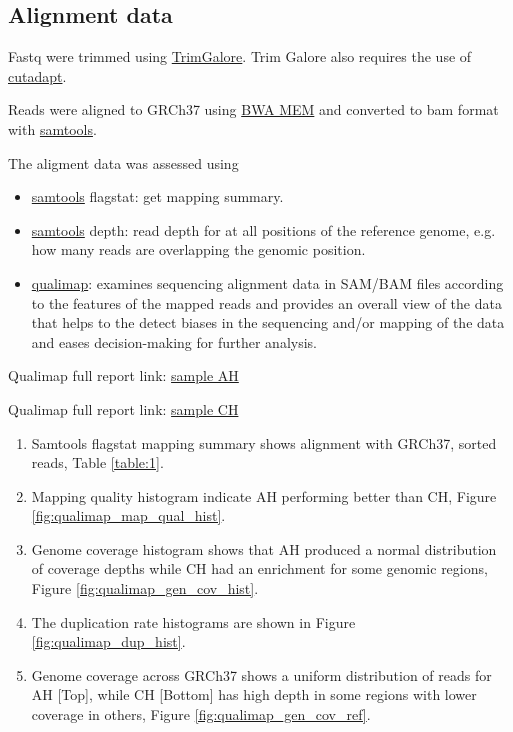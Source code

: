 \documentclass{article}
\begin{document}
\clearpage
\subsection{Alignment data}
\label{align_data}
Fastq were trimmed using
\href{https://www.bioinformatics.babraham.ac.uk/projects/trim_galore/}{TrimGalore}.  
Trim Galore also requires the use of 
\href{ https://github.com/marcelm/cutadapt/}{cutadapt}.

Reads were aligned to GRCh37 using 
\href{http://bio-bwa.sourceforge.net}{BWA MEM} and converted to bam format with 
\href{http://www.htslib.org}{samtools}.

The aligment data was assessed using 
\begin{itemize}
\item \href{http://www.htslib.org}{samtools} flagstat: get mapping summary.
\item \href{http://www.htslib.org}{samtools} depth: read depth for at all positions of the reference genome, e.g. how many reads are overlapping the genomic position.
\item \href{http://qualimap.conesalab.org}{qualimap}: examines sequencing alignment data in SAM/BAM files according to the features of the mapped reads and provides an overall view of the data that helps to the detect biases in the sequencing and/or mapping of the data and eases decision-making for further analysis.
\end{itemize}

Qualimap full report link:
\href{https://lawlessgenomics.com/pages/sophia/AH_S1_L001.sort_stats/qualimapReport.html}{sample AH}

Qualimap full report link:
\href{https://lawlessgenomics.com/pages/sophia/CH_S2_L001.sort_stats/qualimapReport.html}{sample CH}

\begin{enumerate}
\item Samtools flagstat mapping summary shows alignment with GRCh37, sorted reads, Table \ref{table:1}.\\
\item Mapping quality histogram indicate AH performing better than CH, Figure \ref{fig:qualimap_map_qual_hist}.
\item Genome coverage histogram shows that AH produced a normal distribution of coverage depths while CH had an enrichment for some genomic regions, Figure \ref{fig:qualimap_gen_cov_hist}.
\item The duplication rate histograms are shown in Figure \ref{fig:qualimap_dup_hist}.
\item Genome coverage across GRCh37 shows a uniform distribution of reads for AH [Top], while CH [Bottom] has high depth in some regions with lower coverage in others, Figure \ref{fig:qualimap_gen_cov_ref}.
\end{enumerate}
\end{document}
